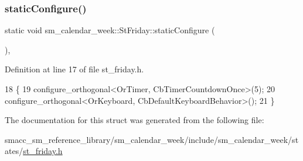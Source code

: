 \subsubsection{\texorpdfstring{static\+Configure()}{staticConfigure()}}
{\footnotesize\ttfamily static void sm\+\_\+calendar\+\_\+week\+::\+St\+Friday\+::static\+Configure (\begin{DoxyParamCaption}{ }\end{DoxyParamCaption})\hspace{0.3cm}{\ttfamily [inline]}, {\ttfamily [static]}}



Definition at line 17 of file st\+\_\+friday.\+h.


\begin{DoxyCode}
18     \{
19         configure\_orthogonal<OrTimer,  CbTimerCountdownOnce>(5);    
20         configure\_orthogonal<OrKeyboard, CbDefaultKeyboardBehavior>();
21     \}
\end{DoxyCode}


The documentation for this struct was generated from the following file\+:\begin{DoxyCompactItemize}
\item 
smacc\+\_\+sm\+\_\+reference\+\_\+library/sm\+\_\+calendar\+\_\+week/include/sm\+\_\+calendar\+\_\+week/states/\hyperlink{st__friday_8h}{st\+\_\+friday.\+h}\end{DoxyCompactItemize}
